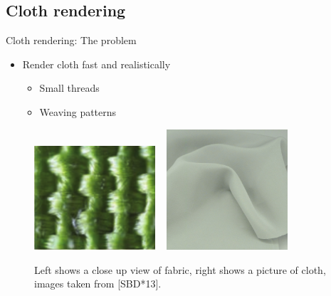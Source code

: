 \documentclass{beamer}
\begin{document}

\subsection{Cloth rendering}
\begin{frame}{Cloth rendering: The problem}
\begin{itemize}
\setlength\itemsep{0.5em}
\item Render cloth fast and realistically 
		\begin{itemize}
		\setlength\itemsep{0.5em}
		\item Small threads
		\item Weaving patterns
		\end{itemize}
\end{itemize}
\begin{figure}[t!]
\begin{center}
\includegraphics[width=0.4\textwidth]{img/cloth_real} 
~
\includegraphics[width=0.4\textwidth]{img/cloth_reference}
\caption*{\tiny{Left shows a close up view of fabric, right shows a picture of cloth, images taken from [SBD*13].}}
\end{center}
\end{figure}
\end{frame}
\end{document}
